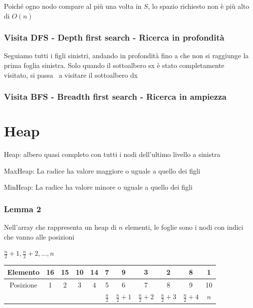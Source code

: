 \documentclass[tikz]{article}
\begin{document}
{{{{Poiché ogno nodo compare al più una volta in $S$, lo spazio richiesto non è più alto di $O(n)$}

\subsubsection{Visita DFS - Depth first search - Ricerca in profondità}

{Seguiamo tutti i figli sinistri, andando in profondità fino a che non si raggiunge la prima foglia sinistra. Solo quando il sottoalbero sx è stato completamente visitato, si passa ~a visitare il sottoalbero dx}



\subsubsection{Visita BFS - Breadth first search - Ricerca in ampiezza}

\section{Heap}

{Heap: albero quasi completo con tutti i nodi dell'ultimo livello a sinistra}

{MaxHeap: La radice ha valore maggiore o uguale a quello dei figli}

{MinHeap: La radice ha valore minore o uguale a quello dei figli}

\subsubsection{Lemma 2}

{Nell'array che rappresenta un heap di $n$ elementi, le foglie sono i nodi con indici che vanno alle posizioni}

$\frac{n}{2}+1,\frac{n}{2}+2,\ldots,n$



\begin{tabular}{|c|c|c|c|c|c|c|c|c|c|c|}
\hline 
Elemento & 16 & 15 & 10 & 14 & 7 & 9 & 3 & 2 & 8 & 1 \\ 
\hline 
Posizione & 1 & 2 & 3 & 4 & 5 & 6 & 7 & 8 & 9 & 10 \\ 
\hline 
 &  &  &  &  & $\frac{n}{2}$ & $\frac{n}{2}+1$ & $\frac{n}{2}+2$ & $\frac{n}{2}+3$ & $\frac{n}{2}+4$ & $n$ \\ 
\hline 
\end{tabular} 

}}}
\end{document}
